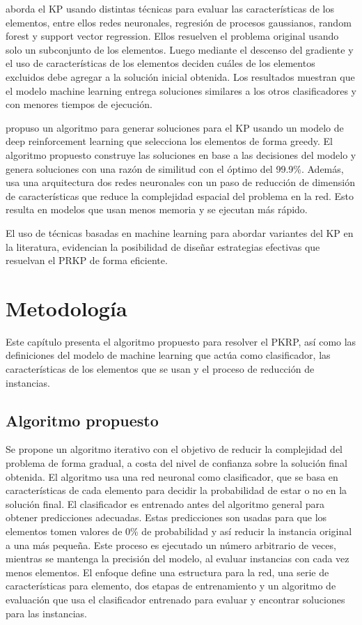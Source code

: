 \documentclass[spanish, a4paper, 12pt, openany,final]{book}
\begin{document}
\cite{rezoug_application_2022} aborda el KP usando distintas técnicas para evaluar las características de los elementos, entre ellos redes neuronales, regresión de procesos gaussianos, random forest y support vector regression. Ellos resuelven el problema original usando solo un subconjunto de los elementos. Luego mediante el descenso del gradiente y el uso de características de los elementos deciden cuáles de los elementos excluidos debe agregar a la solución inicial obtenida. Los resultados muestran que el modelo machine learning entrega soluciones similares a los otros clasificadores y con menores tiempos de ejecución.

\cite{afshar_state_2020} propuso un algoritmo para generar soluciones para el KP usando un modelo de deep reinforcement learning que selecciona los elementos de forma greedy. El algoritmo propuesto construye las soluciones en base a las decisiones del modelo y genera soluciones con una razón de similitud con el óptimo del 99.9\%. Además, usa una arquitectura dos redes neuronales con un paso de reducción de dimensión de características que reduce la complejidad espacial del problema en la red. Esto resulta en modelos que usan menos memoria y se ejecutan más rápido.

El uso de técnicas basadas en machine learning para abordar variantes del KP en la literatura, evidencian la posibilidad de diseñar estrategias efectivas que resuelvan el PRKP de forma eficiente.
 

\chapter{Metodología}

Este capítulo presenta el algoritmo propuesto para resolver el PKRP, así como las definiciones del modelo de machine learning que actúa como clasificador, las características de los elementos que se usan y el proceso de reducción de instancias.

\section{Algoritmo propuesto}

Se propone un algoritmo iterativo con el objetivo de reducir la complejidad del problema de forma gradual, a costa del nivel de confianza sobre la solución final obtenida. El algoritmo usa una red neuronal como clasificador, que se basa en características de cada elemento para decidir la probabilidad de estar o no en la solución final. El clasificador es entrenado antes del algoritmo general para obtener predicciones adecuadas. Estas predicciones son usadas para que los elementos tomen valores de 0\% de probabilidad y así reducir la instancia original a una más pequeña. Este proceso es ejecutado un número arbitrario de veces, mientras se mantenga la precisión del modelo, al evaluar instancias con cada vez menos elementos. El enfoque define una estructura para la red, una serie de características para elemento, dos etapas de entrenamiento y un algoritmo de evaluación que usa el clasificador entrenado para evaluar y encontrar soluciones para las instancias.
\end{document}
